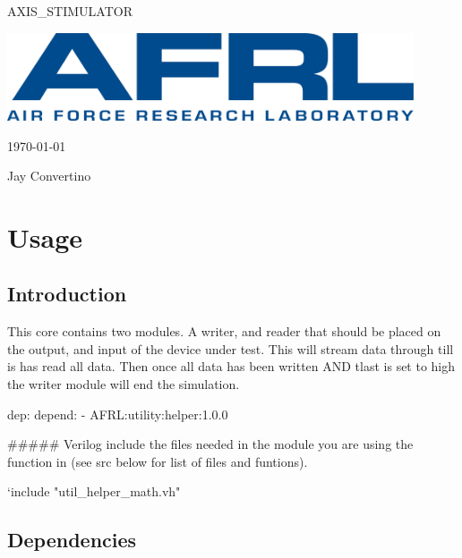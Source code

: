 \begin{titlepage}
  \begin{center}

  {\Huge AXIS\_STIMULATOR}

  \vspace{25mm}

  \includegraphics[width=0.90\textwidth,height=\textheight,keepaspectratio]{img/AFRL.png}

  \vspace{25mm}

  \today

  \vspace{15mm}

  {\Large Jay Convertino}

  \end{center}
\end{titlepage}

\tableofcontents

\newpage

\section{Usage}

\subsection{Introduction}

\par
This core contains two modules. A writer, and reader that should be placed on the
output, and input of the device under test. This will stream data through till
is has read all data. Then once all data has been written AND tlast is set to high
the writer module will end the simulation.


  dep:
    depend:
      - AFRL:utility:helper:1.0.0

##### Verilog include the files needed in the module you are using the function in (see src below for list of files and funtions).

`include "util_helper_math.vh"


\subsection{Dependencies}

